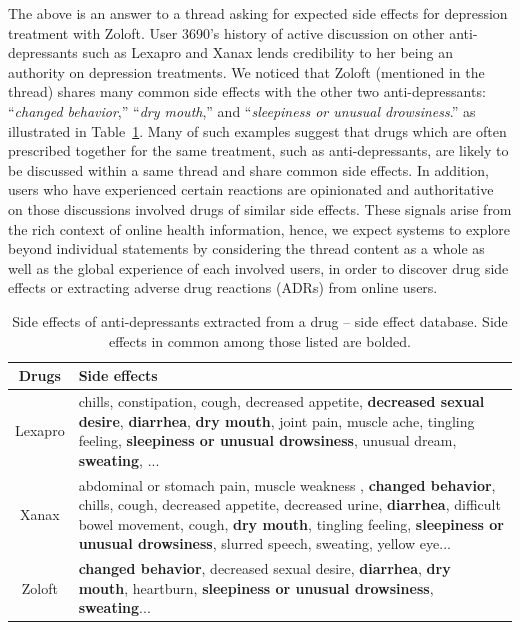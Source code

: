 \documentclass{bmcart}
\begin{document}
The above is an answer to a thread asking for expected side effects for
depression treatment with Zoloft. User 3690's history of active
discussion on other anti-depressants such as Lexapro and Xanax lends credibility to her being an authority on depression treatments. We noticed that Zoloft (mentioned in the thread) shares many common side effects with the other two anti-depressants: ``\textit{changed behavior},'' ``\textit{dry mouth},'' and ``\textit{sleepiness or unusual
drowsiness}.'' as illustrated in 
Table~\ref{anti_depressant_side_effects}. Many of such examples suggest that drugs which are often prescribed together for the same treatment, such as anti-depressants, are likely to be discussed within a same thread and share common side effects. In addition, users who have experienced certain reactions are opinionated and authoritative on those discussions involved drugs of similar side effects. These signals arise from the rich context of online health information, hence, we expect systems to explore beyond individual statements by considering the thread content as a whole as well as the global experience of each involved users, in order to discover drug side effects or extracting 
adverse drug reactions (ADRs) from online users.

\begin{table}[t!]
  \centering
  \captionsetup{justification=centering}
  \footnotesize
  \begin{tabular}{|c||p{10.5cm}|}
    \hline
    Drugs & Side effects \\ \hline \hline
    Lexapro & chills, constipation, cough, decreased appetite, \textbf{decreased sexual desire}, \textbf{diarrhea}, \textbf{dry mouth}, joint pain, muscle ache, tingling feeling, \textbf{sleepiness or unusual drowsiness}, unusual dream, \textbf{sweating}, ... \\ \hline
    Xanax &  abdominal or stomach pain, muscle weakness
      , \textbf{changed behavior}, chills, cough, decreased appetite, decreased urine, \textbf{diarrhea}, difficult bowel movement, cough, \textbf{dry mouth}, tingling feeling, \textbf{sleepiness or unusual drowsiness}, slurred speech, sweating, yellow eye... \\ \hline
    Zoloft &  \textbf{changed behavior}, decreased sexual desire, \textbf{diarrhea}, \textbf{dry mouth}, heartburn, \textbf{sleepiness or unusual drowsiness}, \textbf{sweating}... \\ \hline
  \end{tabular}
  \caption{Side effects of anti-depressants extracted from a drug -- side effect database. Side effects in common among those listed are bolded.} \label{anti_depressant_side_effects}
\end{table}
\end{document}
